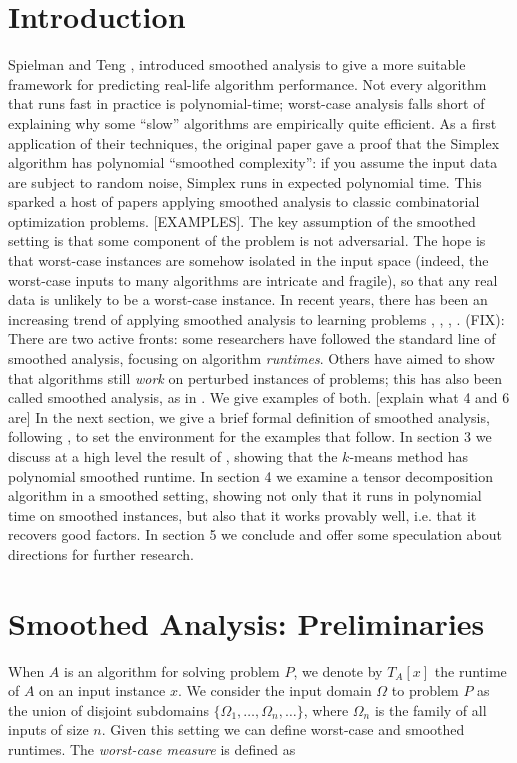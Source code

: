 \documentclass[11pt]{article}
\theoremstyle{definition}
\begin{document}
\section{Introduction}
Spielman and Teng \cite{SA}, \cite{SAtwo} introduced smoothed analysis
to give a more suitable framework for predicting real-life algorithm
performance. Not every algorithm that runs fast in practice is
polynomial-time; worst-case analysis falls short of explaining why
some ``slow'' algorithms are empirically quite efficient. As a first
application of their techniques, the original paper \cite{SA} gave a
proof that the Simplex algorithm has polynomial ``smoothed
complexity'': if you assume the input data are subject to random
noise, Simplex runs in expected polynomial time. This sparked a host
of papers applying smoothed analysis to classic combinatorial
optimization problems. [EXAMPLES]. The key assumption of the smoothed
setting is that some component of the problem is not adversarial. The
hope is that worst-case instances are somehow isolated in the input
space (indeed, the worst-case inputs to many algorithms are intricate
and fragile), so that any real data is unlikely to be a worst-case
instance. In recent years, there has been an increasing trend of
applying smoothed analysis to learning problems \cite{SAtwo},
\cite{SAkmeans}, \cite{PAC}, \cite{TD}. (FIX): There are two active fronts:
some researchers have followed the standard line of smoothed analysis,
focusing on algorithm \emph{runtimes}. Others have aimed to show that
algorithms still \emph{work} on perturbed instances of problems; this
has also been called smoothed analysis, as in \cite{TD}. We give
examples of both. [explain what 4 and 6 are] In the next section, we
give a brief formal definition of smoothed analysis, following
\cite{SAtwo}, to set the environment for the examples that follow. In
section 3 we discuss at a high level the result of \cite{SAkmeans},
showing that the $k$-means method has polynomial smoothed runtime. In
section 4 we examine a tensor decomposition algorithm in a smoothed
setting, showing not only that it runs in polynomial time on
smoothed instances, but also that it works provably well, i.e. that it
recovers good factors. In section 5 we conclude and offer some
speculation about directions for further research.

\section{Smoothed Analysis: Preliminaries}
When $A$ is an algorithm for solving problem $P$, we denote by
$T_A[x]$ the runtime of $A$ on an input instance $x$. We consider the
input domain $\Omega$ to problem $P$ as the union of disjoint
subdomains $\{\Omega_1,\ldots, \Omega_n,\ldots\}$, where $\Omega_n$ is
the family of all inputs of size $n$. Given this setting we can define
worst-case and smoothed runtimes. The \emph{worst-case measure} is defined as
\end{document}
